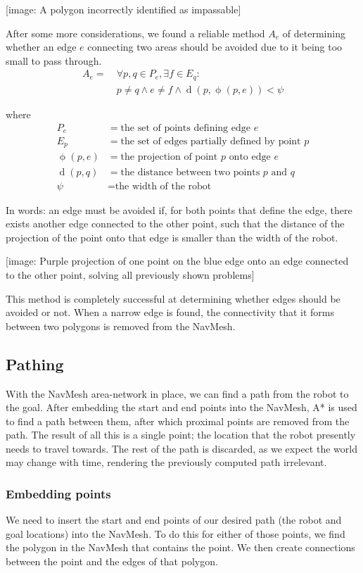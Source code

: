 \documentclass[10pt,twocolumn]{scrartcl}
\DeclareMathOperator{\dist}{d}
\DeclareMathOperator{\proj}{\phi}
\begin{document}
[image: A polygon incorrectly identified as impassable]

After some more considerations, we found a reliable method $A_e$ of determining whether an edge $e$ connecting two areas should be avoided due to it being too small to pass through.
\begin{align*}
A_e = &\ \forall p,q \in P_e, \exists f \in E_q : \\
&\ p \neq q \land e \neq f \land \dist(p,\proj(p,e)) < \psi
\end{align*}

where
\begin{align*}
P_e &= \textrm{the set of points defining edge $e$} \\
E_p &= \textrm{the set of edges partially defined by point $p$} \\
\proj(p,e) &= \textrm{the projection of point $p$ onto edge $e$} \\
\dist(p,q) &= \textrm{the distance between two points $p$ and $q$} \\
\psi &= \textrm{the width of the robot}
\end{align*}

In words: an edge must be avoided if, for both points that define the edge, there exists another edge connected to the other point, such that the distance of the projection of the point onto that edge is smaller than the width of the robot.

[image: Purple projection of one point on the blue edge onto an edge connected to the other point, solving all previously shown problems]

This method is completely successful at determining whether edges should be avoided or not. When a narrow edge is found, the connectivity that it forms between two polygons is removed from the NavMesh.

\subsection{Pathing}
With the NavMesh area-network in place, we can find a path from the robot to the goal. After embedding the start and end points into the NavMesh, A* is used to find a path between them, after which proximal points are removed from the path. The result of all this is a single point; the location that the robot presently needs to travel towards. The rest of the path is discarded, as we expect the world may change with time, rendering the previously computed path irrelevant.

\subsubsection{Embedding points}
We need to insert the start and end points of our desired path (the robot and goal locations) into the NavMesh. To do this for either of those points, we find the polygon in the NavMesh that contains the point. We then create connections between the point and the edges of that polygon.
\end{document}
